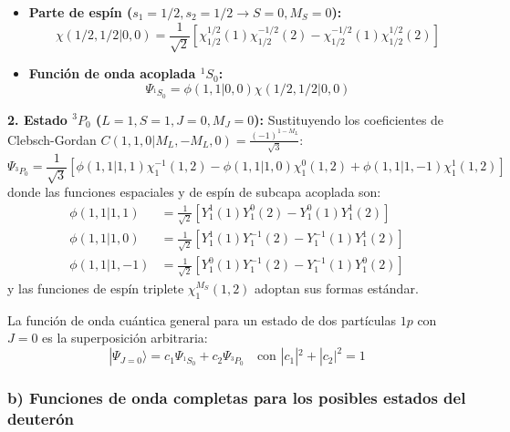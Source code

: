 \begin{problema}
\begin{itemize}
    \item \textbf{Parte de espín ($s_1=1/2, s_2=1/2 \to S=0, M_S=0$):}
    \begin{equation}
    \chi(1/2,1/2|0,0) = \frac{1}{\sqrt{2}} \left[ \chi_{1/2}^{1/2}(1) \chi_{1/2}^{-1/2}(2) - \chi_{1/2}^{-1/2}(1) \chi_{1/2}^{1/2}(2) \right]
    \end{equation}

    \item \textbf{Función de onda acoplada ${}^1S_0$:}
    \begin{equation}
    \Psi_{{}^1S_0} = \phi(1,1|0,0) \chi(1/2,1/2|0,0)
    \end{equation}
\end{itemize}

\textbf{2. Estado ${}^3P_0$ ($L=1, S=1, J=0, M_J=0$):}
Sustituyendo los coeficientes de Clebsch-Gordan $C(1, 1, 0 | M_L, -M_L, 0) = \frac{(-1)^{1-M_L}}{\sqrt{3}}$:
\begin{equation}
\Psi_{{}^3P_0} = \frac{1}{\sqrt{3}} \left[ \phi(1,1|1,1) \chi_1^{-1}(1,2) - \phi(1,1|1,0) \chi_1^0(1,2) + \phi(1,1|1,-1) \chi_1^1(1,2) \right]
\end{equation}
donde las funciones espaciales y de espín de subcapa acoplada son:
\begin{align}
\phi(1,1|1,1) &= \frac{1}{\sqrt{2}} \left[ Y_1^1(1) Y_1^0(2) - Y_1^0(1) Y_1^1(2) \right] \\
\phi(1,1|1,0) &= \frac{1}{\sqrt{2}} \left[ Y_1^1(1) Y_1^{-1}(2) - Y_1^{-1}(1) Y_1^1(2) \right] \\
\phi(1,1|1,-1) &= \frac{1}{\sqrt{2}} \left[ Y_1^0(1) Y_1^{-1}(2) - Y_1^{-1}(1) Y_1^0(2) \right]
\end{align}
y las funciones de espín triplete $\chi_1^{M_S}(1,2)$ adoptan sus formas estándar.

La función de onda cuántica general para un estado de dos partículas $1p$ con $J = 0$ es la superposición arbitraria:
\begin{equation}
|\Psi_{J=0}\rangle = c_1 \Psi_{{}^1S_0} + c_2 \Psi_{{}^3P_0} \quad \text{con } |c_1|^2 + |c_2|^2 = 1
\end{equation}

\begin{center}
\end{center}

\newpage

\subsubsection*{b) Funciones de onda completas para los posibles estados del deuterón}


\end{problema}
